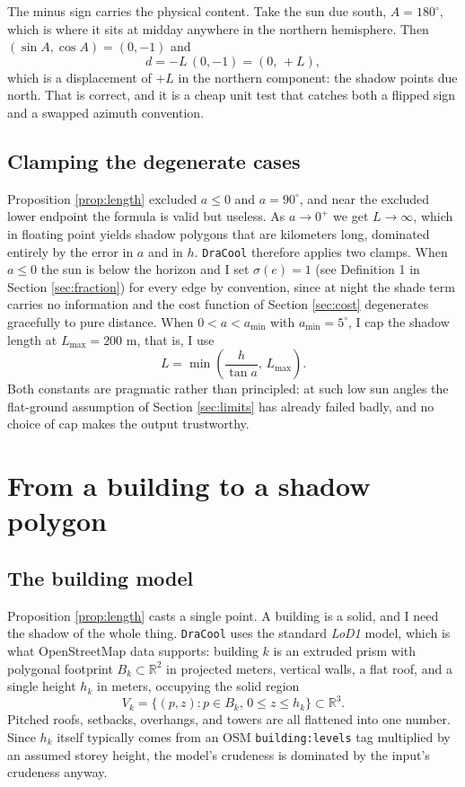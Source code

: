 \documentclass[11pt,a4paper]{article}
\theoremstyle{plain}
\theoremstyle{definition}
\theoremstyle{remark}
\begin{document}
The minus sign carries the physical content. Take the sun due south, $A = 180^\circ$, which is where it sits at midday anywhere in the northern hemisphere. Then $(\sin A, \cos A) = (0, -1)$ and
$$d = -L\,(0,-1) = (0, \,  +L),$$
which is a displacement of $+L$ in the northern component: the shadow points due north. That is correct, and it is a cheap unit test that catches both a flipped sign and a swapped azimuth convention.

\subsection{Clamping the degenerate cases}

Proposition \ref{prop:length} excluded $a \le 0$ and $a = 90^\circ$, and near the excluded lower endpoint the formula is valid but useless. As $a \to 0^+$ we get $L \to \infty$, which in floating point yields shadow polygons that are kilometers long, dominated entirely by the error in $a$ and in $h$. \texttt{DraCool} therefore applies two clamps. When $a \le 0$ the sun is below the horizon and I set $\sigma(e) = 1$ (see Definition 1 in Section \ref{sec:fraction}) for every edge by convention, since at night the shade term carries no information and the cost function of Section \ref{sec:cost} degenerates gracefully to pure distance. When $0 < a < a_{\min}$ with $a_{\min} = 5^\circ$, I cap the shadow length at $L_{\max} = 200$ m, that is, I use
$$L = \min \left(\frac{h}{\tan a}, \,  L_{\max}\right).$$
Both constants are pragmatic rather than principled: at such low sun angles the flat-ground assumption of Section \ref{sec:limits} has already failed badly, and no choice of cap makes the output trustworthy.

\section{From a building to a shadow polygon}
\label{sec:polygon}

\subsection{The building model}

Proposition \ref{prop:length} casts a single point. A building is a solid, and I need the shadow of the whole thing. \texttt{DraCool} uses the standard \emph{LoD1} model, which is what OpenStreetMap data supports: building $k$ is an extruded prism with polygonal footprint $B_k \subset \mathbb{R}^2$ in projected meters, vertical walls, a flat roof, and a single height $h_k$ in meters, occupying the solid region
$$V_k = \{(p, z) : p \in B_k, \,  0 \le z \le h_k\} \subset \mathbb{R}^3.$$
Pitched roofs, setbacks, overhangs, and towers are all flattened into one number. Since $h_k$ itself typically comes from an OSM \texttt{building:levels} tag multiplied by an assumed storey height, the model's crudeness is dominated by the input's crudeness anyway.
\end{document}
